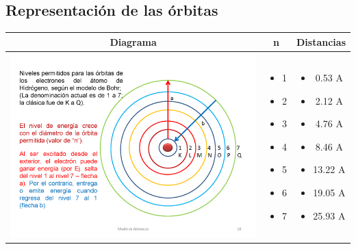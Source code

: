 \documentclass[12pt,a4paper]{article}
\begin{document}
\subsection*{Representación de las órbitas}
\begin{center}
  \begin{tabular}{ | c | c | c | }
    \hline
    Diagrama & n & Distancias \\ \hline
    \begin{minipage}{.3\textwidth}
    \centering\includegraphics[scale=0.65]{orbitas}
    \end{minipage}
    &
    \begin{minipage}[c]{6cm}
      \begin{itemize}
        \item 1
        \item 2
        \item 3
        \item 4
        \item 5
        \item 6
        \item 7
      \end{itemize}
    \end{minipage}
    & 
    \begin{minipage}[c]{6cm}
      \begin{itemize}
        \item 0.53 A
        \item 2.12 A
        \item 4.76 A
        \item 8.46 A
        \item 13.22 A
        \item 19.05 A
        \item 25.93 A
      \end{itemize}
    \end{minipage}
    \\ \hline
  \end{tabular} 
\end{center}
\end{document}

